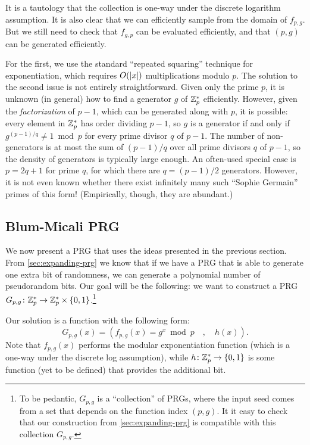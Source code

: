 \documentclass[11pt]{article}
\begin{document}
It is a tautology that the collection is one-way under the discrete
logarithm assumption.  It is also clear that we can efficiently sample
from the domain of $f_{p,g}$.  But we still need to check that
$f_{g,p}$ can be evaluated efficiently, and that $(p,g)$ can be
generated efficiently.

For the first, we use the standard ``repeated squaring'' technique for
exponentiation, which requires $O(\lvert x\rvert)$ multiplications modulo
$p$.  The solution to the second issue is not entirely
straightforward.  Given only the prime $p$, it is unknown (in general)
how to find a generator $g$ of $\mathbb{Z}_p^{*}$ efficiently.  However, given
the \emph{factorization} of $p-1$, which can be generated along with
$p$, it is possible: every element in $\mathbb{Z}_p^{*}$ has order dividing
$p-1$, so $g$ is a generator if and only if $g^{(p-1)/q} \neq 1 \bmod
p$ for every prime divisor $q$ of $p-1$.  The number of non-generators
is at most the sum of $(p-1)/q$ over all prime divisors $q$ of $p-1$,
so the density of generators is typically large enough.  An often-used
special case is $p = 2q+1$ for prime $q$, for which there are $q =
(p-1)/2$ generators.  However, it is not even known whether there
exist infinitely many such ``Sophie Germain'' primes of this form!
(Empirically, though, they are abundant.)


\subsection{Blum-Micali PRG}
\label{sec:blum-micali-prg}

We now present a PRG that uses the ideas presented in the previous
section.  From \cref{sec:expanding-prg} we know that if we have
a PRG that is able to generate one extra bit of randomness, we can
generate a polynomial number of pseudorandom bits.  Our goal will be
the following: we want to construct a PRG $G_{p,g} \colon \mathbb{Z}_p^* \to
\mathbb{Z}_p^* \times \{0,1\}$.\footnote{To be pedantic, $G_{p,g}$ is a
  ``collection'' of PRGs, where the input seed comes from a set that
  depends on the function index $(p,g)$.  It it easy to check that our
  construction from \cref{sec:expanding-prg} is compatible with
  this collection $G_{p,g}$.}

Our solution is a function with the following form: \[ G_{p,g}(x)=
(f_{p,g}(x)=g^x \bmod p \quad, \quad h(x)). \] Note that $f_{p,g}(x)$
performs the modular exponentiation function (which is a one-way under
the discrete log assumption), while $h \colon \mathbb{Z}_p^{*} \to \{0,1\}$ is
some function (yet to be defined) that provides the additional bit.
\end{document}
